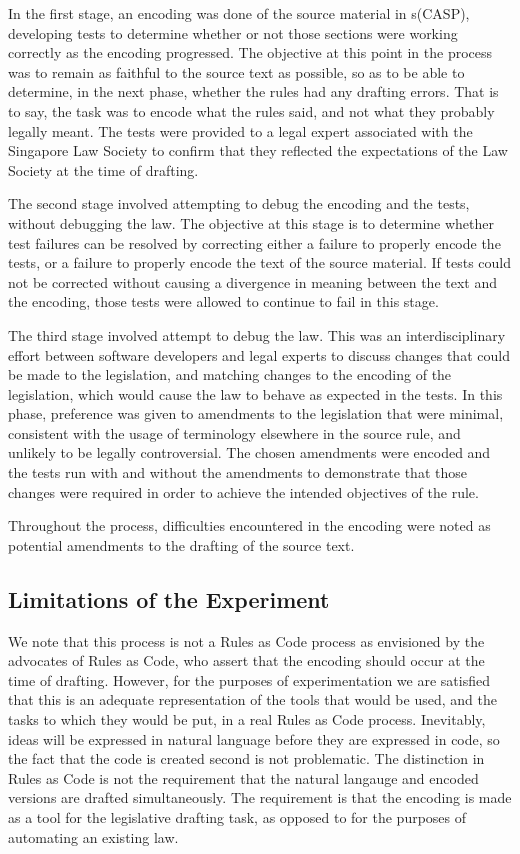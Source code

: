\documentclass[sigconf]{acmart}
\begin{document}
In the first stage, an encoding was done of the
source material in s(CASP), developing tests to determine whether or not those sections were working correctly as
the encoding progressed. The objective at this point in the process was to remain as faithful to the source text as possible, so as to be able to determine, in the next phase, whether the rules had any drafting errors. That is to
say, the task was to encode what the rules said, and not what they probably legally meant. The tests were provided to a legal expert associated with the Singapore
Law Society to confirm that they reflected the expectations of the Law Society at
the time of drafting.

The second stage involved attempting to debug the encoding and the tests, without debugging the law. The
objective at this stage is to determine whether test failures can be resolved by correcting
either a failure to properly encode the tests, or a failure to properly encode the text of the source
material. If tests could not be corrected without causing a divergence in meaning
between the text and the encoding, those tests were allowed to continue to fail in this stage.

The third stage involved attempt to debug the law. This was an interdisciplinary effort between
software developers and legal experts to discuss changes that could be made to the legislation, and matching changes
to the encoding of the legislation, which would cause the law to behave as expected in the tests.
In this phase, preference was given to amendments to the legislation that were minimal, consistent with
the usage of terminology elsewhere in the source rule, and unlikely to be legally controversial. The chosen amendments were encoded and the tests run with and without the amendments to demonstrate that
those changes were required in order to achieve the intended objectives of the rule.

Throughout the process, difficulties encountered in the encoding were noted as 
potential amendments to the drafting
of the source text.

\subsection{Limitations of the Experiment}

We note that this process is not a Rules as Code process as envisioned by the advocates of Rules as Code,
who assert that the encoding should occur at the time of drafting. However, for the purposes of
experimentation we are satisfied that this is an adequate representation of the tools that would be used,
and the tasks to which they would be put, in a real Rules as Code process. Inevitably, ideas will be expressed in natural language before they are expressed
in code, so the fact that the code is created second is not problematic. The distinction in Rules as Code is not the requirement that the natural langauge
and encoded versions are drafted simultaneously. The requirement is that the
encoding is made as a tool for the legislative drafting task, as opposed to
for the purposes of automating an existing law.
\end{document}
